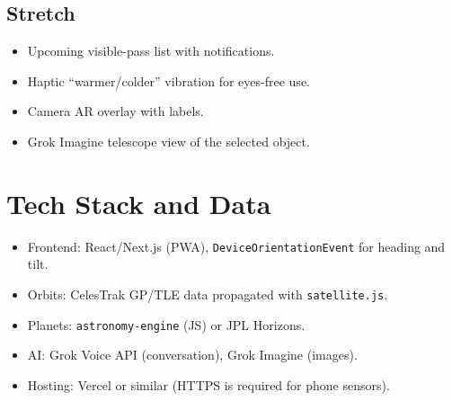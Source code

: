 \documentclass[11pt]{article}
\begin{document}
\subsection{Stretch}
\begin{itemize}
  \item Upcoming visible-pass list with notifications.
  \item Haptic ``warmer/colder'' vibration for eyes-free use.
  \item Camera AR overlay with labels.
  \item Grok Imagine telescope view of the selected object.
\end{itemize}

\section{Tech Stack and Data}
\begin{itemize}
  \item Frontend: React/Next.js (PWA), \texttt{DeviceOrientationEvent} for heading and tilt.
  \item Orbits: CelesTrak GP/TLE data propagated with \texttt{satellite.js}.
  \item Planets: \texttt{astronomy-engine} (JS) or JPL Horizons.
  \item AI: Grok Voice API (conversation), Grok Imagine (images).
  \item Hosting: Vercel or similar (HTTPS is required for phone sensors).
\end{itemize}
\end{document}
